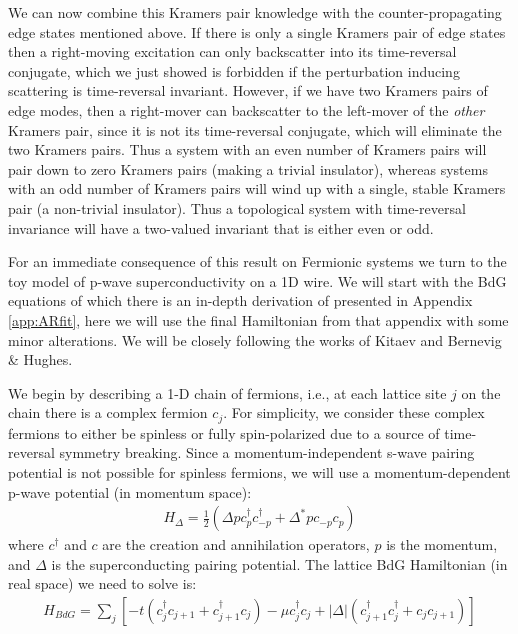 We can now combine this Kramers pair knowledge with the counter-propagating edge states mentioned above. If there is only a single Kramers pair of edge states then a right-moving excitation can only backscatter into its time-reversal conjugate, which we just showed is forbidden if the perturbation inducing scattering is time-reversal invariant. However, if we have two Kramers pairs of edge modes, then a right-mover can backscatter to the left-mover of the \textit{other} Kramers pair, since it is not its time-reversal conjugate, which will eliminate the two Kramers pairs. Thus a system with an even number of Kramers pairs will pair down to zero Kramers pairs (making a trivial insulator), whereas systems with an odd number of Kramers pairs will wind up with a single, stable Kramers pair (a non-trivial insulator)\cite{Hasan2010}. Thus a topological system with time-reversal invariance will have a two-valued invariant that is either even or odd.\par
For an immediate consequence of this result on Fermionic systems we turn to the toy model of p-wave superconductivity on a 1D wire. We will start with the \ac{BdG} equations of which there is an in-depth derivation of presented in Appendix \ref{app:ARfit}, here we will use the final Hamiltonian from that appendix with some minor alterations. We will be closely following the works of Kitaev and Bernevig \& Hughes\cite{Kitaev2001, bernevig_hughes_2013}.\par 
We begin by describing a 1-D chain of fermions, i.e., at each lattice site $j$ on the chain there is a complex fermion $c_{j}$. For simplicity, we consider these complex fermions to either be spinless or fully spin-polarized due to a source of time-reversal symmetry breaking. Since a momentum-independent s-wave pairing potential is not possible for spinless fermions, we will use a momentum-dependent p-wave potential (in momentum space):
\begin{align}
	H_{\Delta} = \frac{1}{2}\left(\Delta pc_{p}^{\dagger}c_{-p}^{\dagger}+\Delta^{*}pc_{-p}c_{p}\right)
\end{align}
where $c^{\dagger}$ and $c$ are the creation and annihilation operators, $p$ is the momentum, and $\Delta$ is the superconducting pairing potential. The lattice \ac{BdG} Hamiltonian (in real space) we need to solve is:
\begin{align}
	H_{BdG} = \sum_{j}\left[-t\left(c_{j}^{\dagger}c_{j+1}+c_{j+1}^{\dagger}c_{j}\right)-\mu c_{j}^{\dagger}c_{j}+|\Delta|\left(c_{j+1}^{\dagger}c_{j}^{\dagger}+c_{j}c_{j+1}\right)\right]
\end{align}
